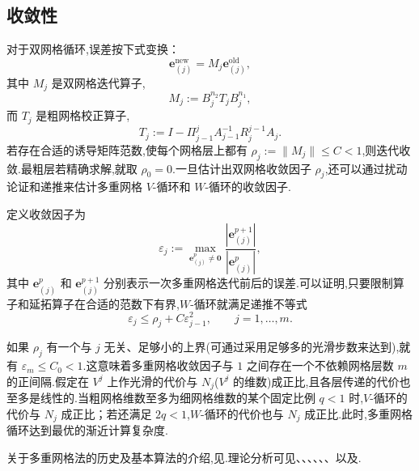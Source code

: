 \subsection{收敛性}\label{sec:2.7.3}

对于双网格循环,误差按下式变换：
\begin{equation}\label{eq:2.7.13}
  \boldsymbol{e}_{(j)}^{\mathrm{new}}=M_j\boldsymbol{e}_{(j)}^{\mathrm{old}},
\end{equation}
其中 \(M_j\) 是双网格迭代算子,
\begin{equation}\label{eq:2.7.14}
  M_j:=B_j^{n_2}T_jB_j^{n_1},
\end{equation}
而 \(T_j\) 是粗网格校正算子,
\begin{equation}\label{eq:2.7.15}
  T_j:=I-\Pi_{j-1}^j A_{j-1}^{-1}R_j^{j-1}A_j.
\end{equation}
若存在合适的诱导矩阵范数,使每个网格层上都有 \(\rho_j:=\|M_j\|\le C<1\),则迭代收敛.最粗层若精确求解,就取 \(\rho_0=0\).一旦估计出双网格收敛因子 \(\rho_j\),还可以通过扰动论证和递推来估计多重网格 \(V\)-循环和 \(W\)-循环的收敛因子.

定义收敛因子为
\begin{equation}\label{eq:2.7.16}
  \varepsilon_j:=\max_{\boldsymbol{e}_{(j)}^p\ne\boldsymbol{0}}
  \frac{|\boldsymbol{e}_{(j)}^{p+1}|}{|\boldsymbol{e}_{(j)}^p|},
\end{equation}
其中 \(\boldsymbol{e}_{(j)}^p\) 和 \(\boldsymbol{e}_{(j)}^{p+1}\) 分别表示一次多重网格迭代前后的误差.可以证明,只要限制算子和延拓算子在合适的范数下有界,\(W\)-循环就满足递推不等式
\[
  \varepsilon_j\le\rho_j+C\varepsilon_{j-1}^2,\qquad j=1,\ldots,m.
\]

如果 \(\rho_j\) 有一个与 \(j\) 无关、足够小的上界(可通过采用足够多的光滑步数来达到),就有 \(\varepsilon_m\le C_0<1\).这意味着多重网格收敛因子与 \(1\) 之间存在一个不依赖网格层数 \(m\) 的正间隔.假定在 \(V^j\) 上作光滑的代价与 \(N_j\)(\(V^j\) 的维数)成正比,且各层传递的代价也至多是线性的.当粗网格维数至多为细网格维数的某个固定比例 \(q<1\) 时,\(V\)-循环的代价与 \(N_j\) 成正比；若还满足 \(2q<1\),\(W\)-循环的代价也与 \(N_j\) 成正比.此时,多重网格循环达到最优的渐近计算复杂度.

关于多重网格法的历史及基本算法的介绍,见.理论分析可见、、、、、、以及.

